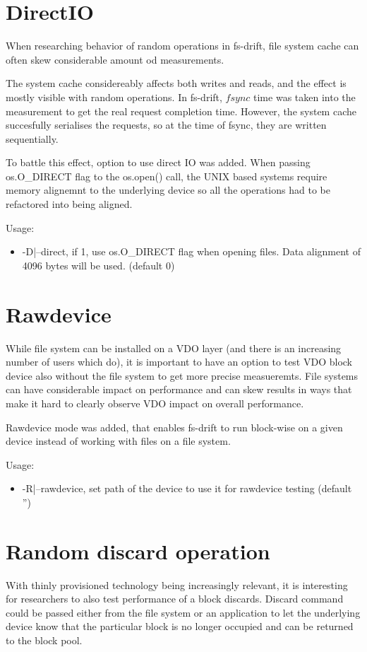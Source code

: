\documentclass[
  color, %
  table, %
  lof,   %
  lot,   %
]{fithesis3}
\begin{document}
\section{DirectIO}
When researching behavior of random operations in fs-drift, file system cache can often skew considerable amount od measurements.


The system cache considereably affects both writes and reads, and the effect is mostly visible with random operations. In fs-drift, $fsync$ time was taken into the measurement to get the real request completion time. However, the system cache succesfully serialises the requests, so at the time of fsync, they are written sequentially.

To battle this effect, option to use direct IO was added. When passing os.O\_DIRECT flag to the os.open() call, the UNIX based systems require memory alignemnt to the underlying device so all the operations had to be refactored into being aligned.

Usage:
\begin{itemize}
    \item -D|--direct, if 1, use os.O\_DIRECT flag when opening files. Data alignment of 4096 bytes will be used. (default 0)
\end{itemize}

\section{Rawdevice}
While file system can be installed on a VDO layer (and there is an increasing number of users which do), it is important to have an option to test VDO block device also without the file system to get more precise measueremts. File systems can have considerable impact on performance and can skew results in ways that make it hard to clearly observe VDO impact on overall performance.

Rawdevice mode was added, that enables fs-drift to run block-wise on a given device instead of working with files on a file system.

Usage:
\begin{itemize}
    \item -R|--rawdevice, set path of the device to use it for rawdevice testing (default '')
\end{itemize}


\section{Random discard operation}
With thinly provisioned technology being increasingly relevant, it is interesting for researchers to also test performance of a block discards. Discard command could be passed either from the file system or an application to let the underlying device know that the particular block is no longer occupied and can be returned to the block pool.
\end{document}
